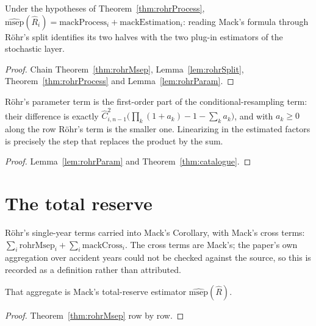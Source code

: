 \begin{corollary}\label{cor:msepSplit}\leanok
{}
Under the hypotheses of Theorem~\ref{thm:rohrProcess},
$\widehat{\mathrm{msep}}(\hat R_i) = \mathrm{mackProcess}_i + \mathrm{mackEstimation}_i$:
reading Mack's formula through R\"ohr's split identifies its two halves with the two plug-in
estimators of the stochastic layer.
\end{corollary}
\begin{proof}\leanok Chain Theorem~\ref{thm:rohrMsep}, Lemma~\ref{lem:rohrSplit},
Theorem~\ref{thm:rohrProcess} and Lemma~\ref{lem:rohrParam}. \end{proof}

\begin{theorem}\label{thm:rohrVsBbmw}\leanok
{}
R\"ohr's parameter term is the first-order part of the conditional-resampling term: their
difference is exactly $\hat C_{i,n-1}^2\big(\prod_k(1+a_k) - 1 - \sum_k a_k\big)$, and with
$a_k \ge 0$ along the row R\"ohr's term is the smaller one. Linearizing in the estimated
factors is precisely the step that replaces the product by the sum.
\end{theorem}
\begin{proof}\leanok Lemma~\ref{lem:rohrParam} and Theorem~\ref{thm:catalogue}. \end{proof}

\section{The total reserve}

\begin{definition}[Aggregate]\label{def:rohrTotal}\leanok
{}
R\"ohr's single-year terms carried into Mack's Corollary, with Mack's cross terms:
$\sum_i \mathrm{rohrMsep}_i + \sum_i \mathrm{mackCross}_i$. The cross terms are Mack's; the
paper's own aggregation over accident years could not be checked against the source, so this
is recorded as a definition rather than attributed.
\end{definition}

\begin{theorem}\label{thm:rohrTotal}\leanok
{}
That aggregate is Mack's total-reserve estimator $\widehat{\mathrm{msep}}(\hat R)$.
\end{theorem}
\begin{proof}\leanok Theorem~\ref{thm:rohrMsep} row by row. \end{proof}

